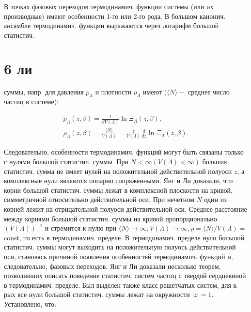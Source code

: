 \documentclass[10pt]{article}
\begin{document}
В точках фазовых переходов термодинамич. функции системы (или их производные) имеют особенности 1-го или 2-го рода. В большом канонич. ансамбле термодинамич. функции выражаются через логарифм большой статистич.



\section{6 ли}

суммы, напр. для давления $p_{\Lambda}$ и плотности $\rho_{\Lambda}$ имеют $(\langle N\rangle-$ среднее число частиц в системе):



\[

\begin{gathered}

p_{\Lambda}(z, \beta)=\frac{1}{\beta V(\Lambda)} \ln \Xi_{\Lambda}(z, \beta), \\

\rho_{\Lambda}(z, \beta)=\frac{\langle N\rangle}{V(\Lambda)}=\frac{z}{V(\Lambda)} \frac{d}{d z} \ln \Xi_{\Lambda}(z, \beta) .

\end{gathered}

\]



Следовательно, особенности термодинамич. функций могут быть связаны только с нулями большой статистич. суммы. При $N<\infty(V(\Lambda)<\infty)$ большая статистич. сумма не имеет нулей на положительной действительной полуоси $z$, а комплексные нули являются попарно сопряженными. Янг и Ли доказали, что корни большой статистич. суммы лежат в комплексной плоскости на кривой, симметричной относительно действительной оси. При нечетном $N$ один из корней лежит на отрицательной полуоси действительной оси. Среднее расстояние между корнями большой статистич. суммы на кривой пропорционально $(V(\Lambda))^{-1}$ и стремится к нулю при $\langle N\rangle \rightarrow \infty, V(\Lambda) \rightarrow \infty, \rho=\langle N\rangle / V(\Lambda)=$ const, то есть в термодинамич. пределе. В термодинамич. пределе нули большой статистич. суммы могут выходить на положительную полуось действительной оси, становясь причиной появления особенностей термодинамич. функций и, следовательно, фазовых переходов. Янг и Ли доказали несколько теорем, позволивших описать поведение статистич. систем частиц с твердой сердцевиной в термодинамич. пределе. Был выделен также класс решетчатых систем, для к-рых все нули большой статистич. суммы лежат на окружности $|z|=1$. Установлено, что:
\end{document}
